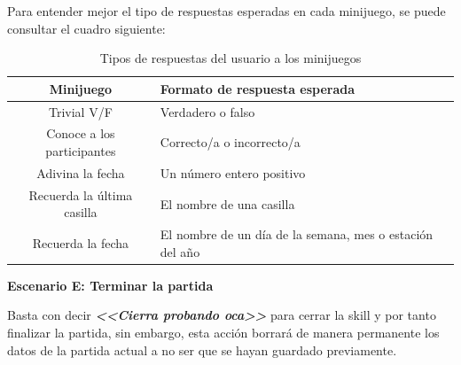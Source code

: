 Para entender mejor el tipo de respuestas esperadas en cada minijuego, se puede consultar el cuadro siguiente:
\begin{table}[H]
	\centering
	\begin{tabular}{|c|p{7cm}|}
		\hline
		\rowcolor{lightgray}
		\textbf{Minijuego} & \textbf{Formato de respuesta esperada}\\
		\hline
		Trivial V/F & Verdadero o falso \\
		\hline
		Conoce a los participantes & Correcto/a o incorrecto/a \\
		\hline
		Adivina la fecha & Un número entero positivo \\
		\hline
		Recuerda la última casilla & El nombre de una casilla \\
		\hline
		Recuerda la fecha & El nombre de un día de la semana, mes o estación del año \\
		\hline
	\end{tabular}
	\caption{Tipos de respuestas del usuario a los minijuegos}
	\label{tab:respuestas-minijuegos}
\end{table}

\textbf{Escenario E: Terminar la partida}

Basta con decir \textbf{\textit{<<Cierra probando oca>>}} para cerrar la skill y por tanto finalizar la partida, sin embargo, esta acción borrará de manera permanente los datos de la partida actual a no ser que se hayan guardado previamente.


